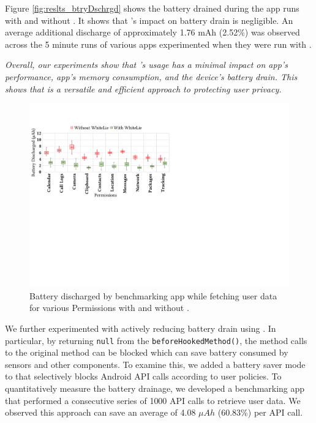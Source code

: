 Figure \ref{fig:reslts_btryDschrgd} shows the battery drained during the  app runs with and without \framework{}. It shows that \framework{}'s impact on battery drain is negligible. An average additional discharge of approximately 1.76 mAh (2.52\%) was observed across the 5 minute runs of various apps experimented when they were run with \framework{}. 

\textit{Overall, our experiments show that \framework{}'s usage has a minimal impact on app's performance, app's memory consumption, and the device's battery drain. This shows that \framework{} is a versatile and efficient approach to protecting user privacy.}

\begin{figure}[t]
    \centering
    \includegraphics[width=0.8\linewidth]{Figures/Performance Evaluation/results_battery_discharged_battery_saver.pdf}
    \caption{Battery discharged by benchmarking app while fetching user data for various Permissions with and without \framework{}.}
    \label{fig:reslts_btrySaver}
\end{figure}

We further experimented with actively reducing battery drain using \framework{}. In particular, by returning \texttt{null} from the \texttt{beforeHookedMethod()}, the method calls to the original method can be blocked which can save battery consumed by sensors and other components. To examine this, we added a battery saver mode to \framework{} that selectively blocks Android API calls according to user policies.  To quantitatively measure the battery drainage, we developed a benchmarking app that performed a consecutive series of 1000 API calls to retrieve user data. We observed this approach can save an average of 4.08 $\mu{}Ah$ (60.83\%) per API call.
